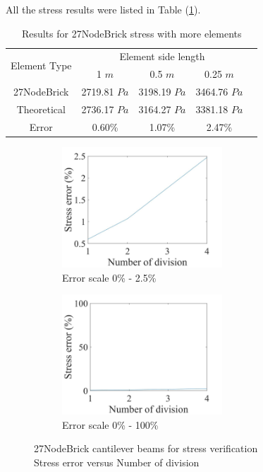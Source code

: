 \documentclass[fleqn,11pt]{article}
\begin{document}
All the stress results were listed in Table (\ref{table Results for 27NodeBrick stress with more elements}). 


\begin{table}[H]
  \centering
  \caption{Results for 27NodeBrick stress with more elements}
  \label{table Results for 27NodeBrick stress with more elements}
  \begin{tabular}{|c|c|c|c|c|}
    \hline 
    \multirow{2}{*}{Element Type} 
       & \multicolumn{3}{|c|}{Element side length} \\ \cline{2-4}
       & 1 $m$ & 0.5 $m$ & 0.25 $m$ \\                              \hline
27NodeBrick & 2719.81 $Pa$ & 3198.19 $Pa$ & 3464.76 $Pa$ \\ \hline
Theoretical & 2736.17 $Pa$ & 3164.27 $Pa$ & 3381.18 $Pa$ \\ \hline
Error       & 0.60\%  & 1.07\%  & 2.47\%        \\ \hline
  \end{tabular}
\end{table}



\begin{figure}[H]
  \begin{subfigure}{0.5\textwidth}
    \centering
    \includegraphics[width=6cm]{../Figure-files/error27brick_beam_stress.jpeg}
    \caption{Error scale 0\% - 2.5\%}
  \end{subfigure}
  \begin{subfigure}{0.5\textwidth}
    \centering
    \includegraphics[width=6cm]{../Figure-files/error27brick_beam_stress100.jpeg}
    \caption{Error scale 0\% - 100\%}
  \end{subfigure}
  \captionsetup{justification=centering,margin=3cm}
  \caption{27NodeBrick cantilever beams for stress verification\\
      Stress error   versus   Number of division}
\end{figure}
\end{document}
